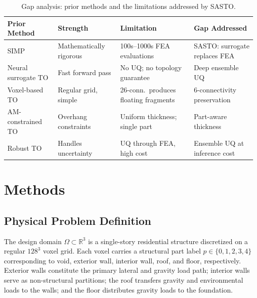 \documentclass[11pt]{article}
\theoremstyle{plain}
\theoremstyle{definition}
\theoremstyle{remark}
\begin{document}
\begin{table}[t]
\centering
\caption{Gap analysis: prior methods and the limitations addressed by SASTO.}
\label{tab:gaps}
\small
\begin{tabular}{@{}p{3.4cm}p{3.0cm}p{4.0cm}p{3.5cm}@{}}
\toprule
\textbf{Prior Method} & \textbf{Strength} & \textbf{Limitation} & \textbf{Gap Addressed} \\
\midrule
SIMP \cite{bendsoe2003} & Mathematically rigorous & 100s--1000s FEA evaluations & SASTO: surrogate replaces FEA \\
\addlinespace
Neural surrogate TO \cite{nie2021} & Fast forward pass & No UQ; no topology guarantee & Deep ensemble UQ \\
\addlinespace
Voxel-based TO \cite{xia2015} & Regular grid, simple & 26-conn.\ produces floating fragments & 6-connectivity preservation \\
\addlinespace
AM-constrained TO \cite{langelaar2016} & Overhang constraints & Uniform thickness; single part & Part-aware thickness \\
\addlinespace
Robust TO \cite{dunning2011} & Handles uncertainty & UQ through FEA, high cost & Ensemble UQ at inference cost \\
\bottomrule
\end{tabular}
\end{table}


\section{Methods}
\label{sec:methods}

\subsection{Physical Problem Definition}
\label{sec:problem}

The design domain $\Omega \subset \mathbb{R}^3$ is a single-story residential structure discretized on a regular $128^3$ voxel grid. Each voxel carries a structural part label $p \in \{0,1,2,3,4\}$ corresponding to void, exterior wall, interior wall, roof, and floor, respectively. Exterior walls constitute the primary lateral and gravity load path; interior walls serve as non-structural partitions; the roof transfers gravity and environmental loads to the walls; and the floor distributes gravity loads to the foundation.
\end{document}
